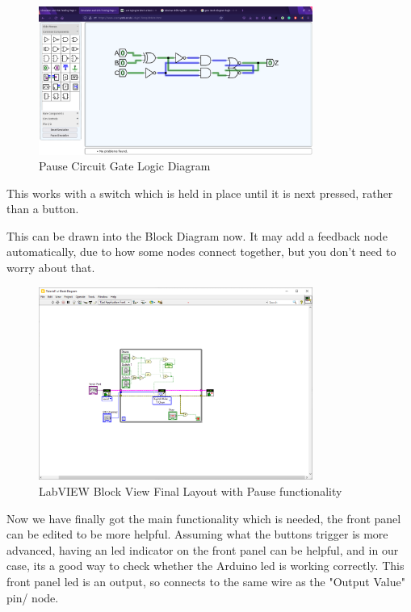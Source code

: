\documentclass[a4paper,11pt]{report}
\begin{document}
\begin{figure}[H]
\centering
\includegraphics[width=0.8\textwidth]{screenshots/pausecircuitlatchgates}
\caption{Pause Circuit Gate Logic Diagram}
\end{figure}

This works with a switch which is held in place until it is next pressed, rather than a button.

This can be drawn into the Block Diagram now. It may add a feedback node automatically, due to how some nodes connect together, but you don't need to worry about that.

\begin{figure}[H]
\centering
\includegraphics[width=0.8\textwidth]{screenshots/labview33}
\caption{LabVIEW Block View Final Layout with Pause functionality}
\end{figure}

Now we have finally got the main functionality which is needed, the front panel can be edited to be more helpful. Assuming what the buttons trigger is more advanced, having an \gls{led} indicator on the front panel can be helpful, and in our case, its a good way to check whether the Arduino \gls{led} is working correctly. This front panel \gls{led} is an output, so connects to the same wire as the "Output Value" pin/ node.
\end{document}
